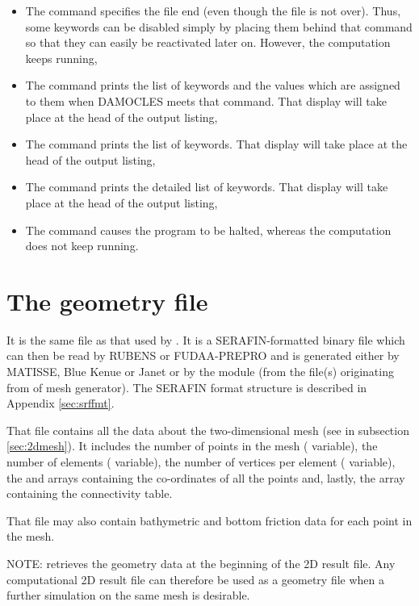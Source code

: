 \begin{itemize}
\item The  command specifies the file end (even though the
file is not over). Thus, some keywords can be disabled simply by placing them
behind that command so that they can easily be reactivated later on. However,
the computation keeps running,

\item The  command prints the list of keywords and the
values which are assigned to them when DAMOCLES meets that command. That
display will take place at the head of the output listing,

\item The  command prints the list of keywords. That
display will take place at the head of the output listing,

\item The  command prints the detailed list of keywords.
That display will take place at the head of the output listing,

\item The  command causes the program to be halted, whereas
the computation does not keep running.
\end{itemize}

\section{The geometry file}

It is the same file as that used by . It is a SERAFIN-formatted
binary file which can then be read by RUBENS or FUDAA-PREPRO and is generated
either by MATISSE, Blue Kenue or Janet or by the \stbtel module (from the
file(s) originating from of mesh generator). The SERAFIN format structure is
described in Appendix \ref{sec:srffmt}.

That file contains all the data about the two-dimensional mesh (see in
subsection \ref{sec:2dmesh}).
It includes the number of points in the mesh (
variable), the number of elements ( variable), the number of
vertices per element ( variable), the  and 
arrays containing the co-ordinates of all the points and, lastly,
the  array containing the connectivity table.

That file may also contain bathymetric and bottom friction data for each point
in the mesh.

NOTE:  retrieves the geometry data at the beginning of the 2D result
file. Any computational 2D result file can therefore be used as a geometry file
when a further simulation on the same mesh is desirable.


